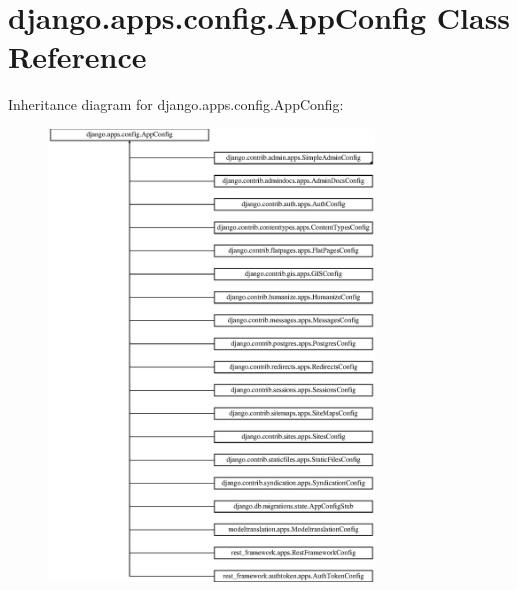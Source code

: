 \hypertarget{classdjango_1_1apps_1_1config_1_1_app_config}{}\section{django.\+apps.\+config.\+App\+Config Class Reference}
\label{classdjango_1_1apps_1_1config_1_1_app_config}
Inheritance diagram for django.\+apps.\+config.\+App\+Config\+:\begin{figure}[H]
\begin{center}
\leavevmode
\includegraphics[height=12.000000cm]{classdjango_1_1apps_1_1config_1_1_app_config}
\end{center}
\end{figure}
